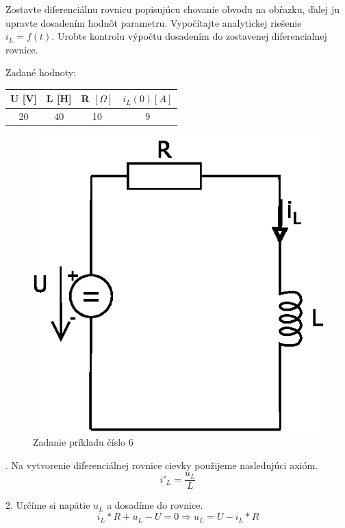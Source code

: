 \documentclass[a4paper,12pt]{article}
\begin{document}
\bigskip
Zostavte diferenciálnu rovnicu popisujúcu chovanie obvodu na obŕazku, ďalej ju upravte dosadením hodnôt parametru. Vypočítajte analytickej riešenie
$i_L = f(t)$. Urobte kontrolu výpočtu dosadením do zostavenej diferencialnej rovnice.
\bigskip

Zadané hodnoty:
\begin{center}
\begin{tabular} {|  c | c | c | c |}
\hline
U [V] & L [H] & R  $[\Omega]$ & $i_L (0) [A]$ \\ \hline
20 & 40 & 10 & 9\\ \hline
\end{tabular}
\end{center}

\begin{figure}[!htb]
\centering
\includegraphics[scale=1.0]{p6/p0.eps}
\caption{Zadanie príkladu číslo 6}
\end{figure}

. Na vytvorenie diferenciálnej rovnice cievky použijeme nasledujúci axióm.
\begin{equation}
i'_L = \frac{u_L}{L}
\end{equation}

2. Určíme si napätie $u_L$ a dosadíme do rovnice.
\begin{equation}
i_L * R + u_L - U = 0 \Rightarrow u_L = U - i_L * R
\end{equation}
\end{document}
